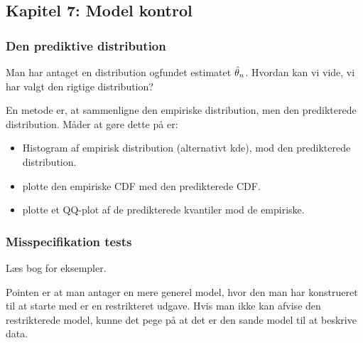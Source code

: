 \subsection{Kapitel 7: Model kontrol}

\subsubsection{Den prediktive distribution}

Man har antaget en distribution ogfundet estimatet $\hat{\theta}_n$. Hvordan kan vi vide, vi har valgt den rigtige distribution?

En metode er, at sammenligne den empiriske distribution, men den predikterede distribution. Måder at gøre dette på er:

\begin{itemize}
    \item Histogram af empirisk distribution (alternativt kde), mod den predikterede distribution.
    \item plotte den empiriske CDF med den predikterede CDF.
    \item plotte et QQ-plot af de predikterede kvantiler mod de empiriske.
\end{itemize}

\subsubsection{Misspecifikation tests}

Læs bog for eksempler.

Pointen er at man antager en mere generel model, hvor den man har konstrueret til at starte med er en restrikteret udgave. Hvis man ikke kan afvise den restrikterede model, kunne det pege på at det er den sande model til at beskrive data.
